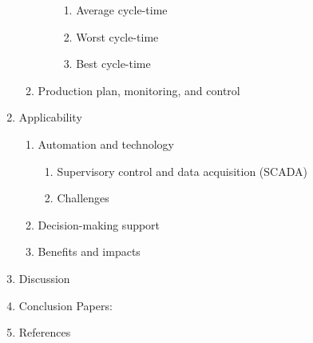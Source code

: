 \documentclass{article}
\begin{document}
\begin{enumerate}
\begin{enumerate}
\begin{enumerate}
\begin{enumerate}
\item Average cycle-time
\label{sec:org3309818}
\item Worst cycle-time
\label{sec:orgd453739}
\item Best cycle-time
\label{sec:orgfc0e24b}
\end{enumerate}
\end{enumerate}
\item Production plan, monitoring, and control
\label{sec:org9e73eb8}
\end{enumerate}
\item Applicability
\label{sec:org8ca50c6}
\begin{enumerate}
\item Automation and technology
\label{sec:orgbef6f0b}
\begin{enumerate}
\item Supervisory control and data acquisition (SCADA)
\label{sec:org6587feb}
\item Challenges
\label{sec:org30352f6}
\end{enumerate}
\item Decision-making support
\label{sec:orgc5500ff}
\item Benefits and impacts
\label{sec:orgf11d0b4}
\end{enumerate}
\item Discussion
\label{sec:org557655a}
\item Conclusion
\label{sec:orga0d4b1a}
Papers:


\cite{Antunes2015a}

\parencite{Antunes2015a}

\parencite{Antunes2015b}

\parencite{Antunes2016}


\parencite{Antunes2017a}

\parencite{Antunes2017c}

\parencite{Antunes2018a}


\item References
\label{sec:orgda51a75}

\printbibliography[title=none]
\end{enumerate}
\end{document}
